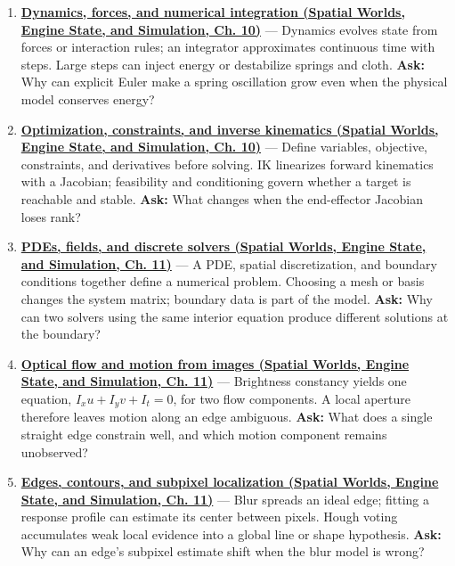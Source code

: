 \begin{enumerate}
\item
  \textbf{\href{../05-Spatial-Worlds-Engine-State-and-Simulation/main.pdf\#nameddest=04-visual-computing-ii-ch029-dynamics-forces-and-numerical-integration}{Dynamics, forces, and numerical integration (Spatial Worlds, Engine State, and Simulation, Ch. 10)}} --- Dynamics evolves state from forces or interaction rules; an integrator approximates continuous time with steps. Large steps can inject energy or destabilize springs and cloth. \textbf{Ask:} Why can explicit Euler make a spring oscillation grow even when the physical model conserves energy?
\item
  \textbf{\href{../05-Spatial-Worlds-Engine-State-and-Simulation/main.pdf\#nameddest=04-visual-computing-ii-ch029-optimization-constraints-and-inverse-kinematics}{Optimization, constraints, and inverse kinematics (Spatial Worlds, Engine State, and Simulation, Ch. 10)}} --- Define variables, objective, constraints, and derivatives before solving. IK linearizes forward kinematics with a Jacobian; feasibility and conditioning govern whether a target is reachable and stable. \textbf{Ask:} What changes when the end-effector Jacobian loses rank?
\item
  \textbf{\href{../05-Spatial-Worlds-Engine-State-and-Simulation/main.pdf\#nameddest=04-visual-computing-ii-ch030-pdes-fields-and-discrete-solvers}{PDEs, fields, and discrete solvers (Spatial Worlds, Engine State, and Simulation, Ch. 11)}} --- A PDE, spatial discretization, and boundary conditions together define a numerical problem. Choosing a mesh or basis changes the system matrix; boundary data is part of the model. \textbf{Ask:} Why can two solvers using the same interior equation produce different solutions at the boundary?
\item
  \textbf{\href{../05-Spatial-Worlds-Engine-State-and-Simulation/main.pdf\#nameddest=04-visual-computing-ii-ch030-optical-flow-and-motion-from-images}{Optical flow and motion from images (Spatial Worlds, Engine State, and Simulation, Ch. 11)}} --- Brightness constancy yields one equation, \(I_xu+I_yv+I_t=0\), for two flow components. A local aperture therefore leaves motion along an edge ambiguous. \textbf{Ask:} What does a single straight edge constrain well, and which motion component remains unobserved?
\item
  \textbf{\href{../05-Spatial-Worlds-Engine-State-and-Simulation/main.pdf\#nameddest=04-visual-computing-ii-ch030-edges-contours-and-subpixel-localization}{Edges, contours, and subpixel localization (Spatial Worlds, Engine State, and Simulation, Ch. 11)}} --- Blur spreads an ideal edge; fitting a response profile can estimate its center between pixels. Hough voting accumulates weak local evidence into a global line or shape hypothesis. \textbf{Ask:} Why can an edge's subpixel estimate shift when the blur model is wrong?

\end{enumerate}
